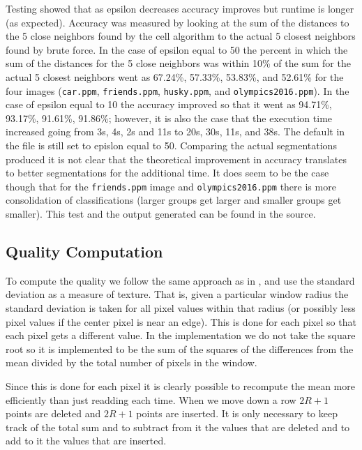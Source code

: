 \documentclass[twocolumn]{article}
\begin{document}
Testing showed that as epsilon decreases accuracy improves but runtime is
longer (as expected). Accuracy was measured by looking at the sum of the
distances to the 5 close neighbors found by the cell algorithm to the actual 5
closest neighbors found by brute force. In the case of epsilon equal to 50 the
percent in which the sum of the distances for the 5 close neighbors was within
10\% of the sum for the actual 5 closest neighbors went as 67.24\%, 57.33\%,
53.83\%, and 52.61\% for the four images (\texttt{car.ppm},
\texttt{friends.ppm}, \texttt{husky.ppm}, and \texttt{olympics2016.ppm}). In
the case of epsilon equal to 10 the accuracy improved so that it went as
94.71\%, 93.17\%, 91.61\%, 91.86\%; however, it is also the case that the
execution time increased going from 3s, 4s, 2s and 11s to 20s, 30s, 11s, and
38s. The default in the file is still set to epislon equal to 50. Comparing
the actual segmentations produced it is not clear that the theoretical
improvement in accuracy translates to better segmentations for the additional
time. It does seem to be the case though that for the \texttt{friends.ppm}
image and \texttt{olympics2016.ppm} there is more consolidation of
classifications (larger groups get larger and smaller groups get
smaller). This test and the output generated can be found in the source. 

\subsection{Quality Computation}

To compute the quality we follow the same approach as in \cite{prev},
and use the standard deviation as a measure of texture. That is, given
a particular window radius the standard deviation is taken for all
pixel values within that radius (or possibly less pixel values if the
center pixel is near an edge). This is done for each pixel so that
each pixel gets a different value. In the implementation we do not
take the square root so it is implemented to be the sum of the squares
of the differences from the mean divided by the total number of pixels
in the window.

Since this is done for each pixel it is clearly possible to
recompute the mean more efficiently than just readding each
time. When we move down a row $2R+1$ points are deleted and $2R+1$
points are inserted. It is only necessary to keep track of the
total sum and to subtract from it the values that are deleted
and to add to it the values that are inserted.  
\end{document}
